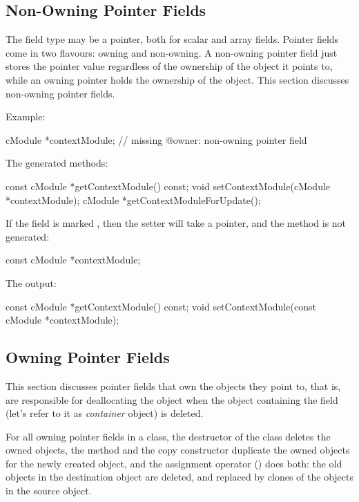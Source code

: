 \subsection{Non-Owning Pointer Fields}
\label{sec:msg-defs:pointers-fields}

The field type may be a pointer, both for scalar and array fields. Pointer
fields come in two flavours: owning and non-owning. A non-owning pointer field
just stores the pointer value regardless of the ownership of the object it
points to, while an owning pointer holds the ownership of the object. This
section discusses non-owning pointer fields.

Example:

\begin{msg}
cModule *contextModule;  // missing @owner: non-owning pointer field
\end{msg}

The generated methods:

\begin{cpp}
const cModule *getContextModule() const;
void setContextModule(cModule *contextModule);
cModule *getContextModuleForUpdate();
\end{cpp}

If the field is marked , then the setter will take a
 pointer, and the  method is not generated:

\begin{msg}
const cModule *contextModule;
\end{msg}

The output:

\begin{cpp}
const cModule *getContextModule() const;
void setContextModule(const cModule *contextModule);
\end{cpp}


\subsection{Owning Pointer Fields}
\label{sec:msg-defs:pointers-fields}

This section discusses pointer fields that own the objects they point to, that
is, are responsible for deallocating the object when the object containing the
field (let's refer to it as \textit{container} object) is deleted.

For all owning pointer fields in a class, the destructor of the class deletes the
owned objects, the  method and the copy constructor duplicate the
owned objects for the newly created object, and the assignment operator
() does both: the old objects in the destination object are
deleted, and replaced by clones of the objects in the source object.

